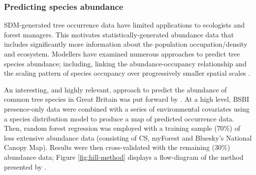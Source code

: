 \subsubsection{Predicting species abundance}

SDM-generated tree occurrence data have limited applications to ecologists and forest managers.
This motivates statistically-generated abundance data that includes significantly 
more information about the population occupation/density and ecosystem.
Modellers have examined numerous approaches to predict tree species abundance;
including, linking the abundance-occupancy relationship \cite{gaston2000abundance} and
the scaling pattern of species occupancy over progressively smaller spatial scales \cite{hui2009extrapolating}.

An interesting, and highly relevant, approach to predict the abundance of common tree species in Great Britain was put forward by \cite{hill.data}.
At a high level, BSBI presence-only data were combined with a series of environmental covariates using a species distribution model to 
produce a map of predicted occurrence data. Then, random forest regression was employed with a training sample ($70\%$) of less extensive abundance 
data (consisting of CS, myForest and Bluesky's National Canopy Map). 
Results were then cross-validated with the remaining ($30\%$) abundance data; Figure \ref{fig:hill-method} displays a
flow-diagram of the method presented by \cite{hill.data}. 

